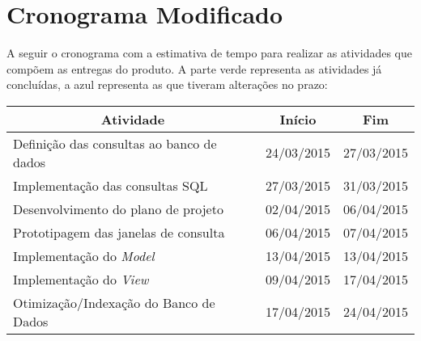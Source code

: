 \documentclass[a4paper,12pt]{article}
\begin{document}
\newpage
\section{Cronograma Modificado}

A seguir o cronograma com a estimativa de tempo para realizar as atividades que compõem as entregas do produto. A parte verde representa as atividades já concluídas, a azul representa as que tiveram alterações no prazo:\\


{\normalsize %

\begin{longtable}{|l|c|c|}
\hline
\multicolumn{1}{|c|}{\textbf{Atividade}}  & \multicolumn{1}{c|}{\textbf{Início}} & \multicolumn{1}{c|}{\textbf{Fim}} \\ \hline

\hline
\rowcolor{electricgreen}
Definição das consultas ao banco de dados & 24/03/2015                           & 27/03/2015                        \\ \hline

\hline
\rowcolor{electricgreen}
Implementação das consultas SQL           & 27/03/2015                           & 31/03/2015                        \\ \hline

\hline
\rowcolor{electricgreen}
Desenvolvimento do plano de projeto       & 02/04/2015                           & 06/04/2015                        \\ 

\hline
\rowcolor{electricgreen}
Prototipagem das janelas de consulta      & 06/04/2015                           & 07/04/2015                        \\ \hline

\hline
\rowcolor{ultramarineblue}
Implementação do \textit{Model}           & 13/04/2015                           & 13/04/2015                        \\ \hline

\hline
\rowcolor{ultramarineblue}
Implementação do \textit{View}            & 09/04/2015                           & 17/04/2015                        \\ \hline

\hline
\rowcolor{ultramarineblue}
Otimização/Indexação do Banco de Dados    & 17/04/2015                           & 24/04/2015                        \\ \hline


\end{longtable}}
\end{document}
